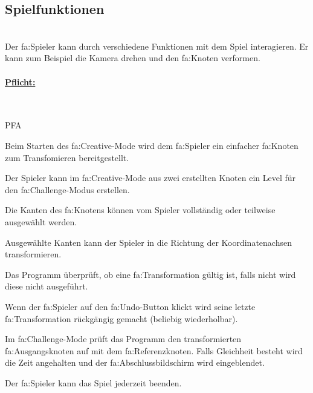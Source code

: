 %
%


\subsection{Spielfunktionen}

%
%
\renewcommand{\K}{}
%
%

~\\
Der \gls{fa:Spieler} kann durch verschiedene Funktionen mit dem Spiel interagieren. Er kann zum Beispiel die Kamera drehen und den \gls{fa:Knoten} verformen. 
\\

%
%
\paragraph*{\underline{Pflicht:}}~\\

\begin{ids}{\gls{PFA\K}}
	 	
 	\id[ 110] Beim Starten des \gls{fa:Creative}-Mode wird dem \gls{fa:Spieler} ein einfacher \gls{fa:Knoten} zum Transfomieren bereitgestellt.
 	
 	\id[ 120] Der Spieler kann im \gls{fa:Creative}-Mode aus zwei erstellten Knoten ein Level für den \gls{fa:Challenge}-Modus erstellen.
 	
 	\id[ 130] Die Kanten des \gls{fa:Knoten}s können vom Spieler vollständig oder teilweise ausgewählt werden.
 	
 	\id[ 140] Ausgewählte Kanten kann der Spieler in die Richtung der Koordinatenachsen transformieren.
 	
 	\id[ 150] Das Programm überprüft, ob eine \gls{fa:Transformation} gültig ist, falls nicht wird diese nicht ausgeführt.
 	
 	\id[ 160] Wenn der \gls{fa:Spieler} auf den \gls{fa:Undo}-Button klickt wird seine letzte \gls{fa:Transformation} rückgängig gemacht (beliebig wiederholbar). 
 	
 	\id[ 170] Im \gls{fa:Challenge}-Mode prüft das Programm den transformierten \gls{fa:Ausgangsknoten} auf mit dem \gls{fa:Referenzknoten}. Falls Gleichheit besteht wird die Zeit angehalten und der \gls{fa:Abschlussbildschirm} wird eingeblendet.
 	
 	\id[ 180] Der \gls{fa:Spieler} kann das Spiel jederzeit beenden.
	
\end{ids}


